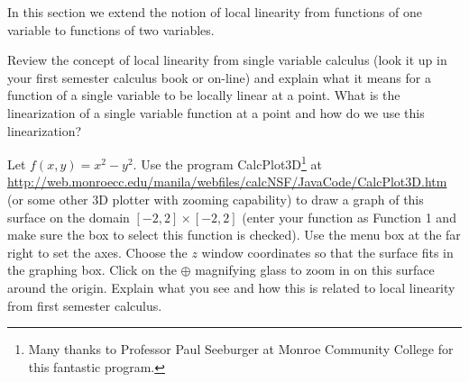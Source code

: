 \begin{pa} \label{PA:10.4} In this section we extend the notion of local linearity from functions of one variable to functions of two variables.
\ba
    \item Review the concept of local linearity from single variable calculus (look it up in your first semester calculus book or on-line) and explain what it means for a function of a single variable to be locally linear at a point. What is the linearization of a single variable function at a point and how do we use this linearization?



\begin{comment}

A function $f$ of the variable $x$ is locally linear at the point $(a,f(a))$ if the graph of $f$ ``looks" like a line (the tangent line) as we zoom in on it near the point $(a,f(a))$. Recall that the line tangent to $f$ at $(a,f(a))$ has equation
\[L(x) = f(a) + f'(a)(x-a).\]
The function $L$ is called the \emph{linearization} of $f$ at $a$. The linearization $L(x)$ is a good approximation of $f(x)$ for values of $x$ close to $a$.

\end{comment}

    \item Let $f(x,y) = x^2-y^2$. Use the program CalcPlot3D\footnote{Many thanks to Professor Paul Seeburger at Monroe Community College for this fantastic program.} at \url{http://web.monroecc.edu/manila/webfiles/calcNSF/JavaCode/CalcPlot3D.htm} (or some other 3D plotter with zooming capability) to draw a graph of this surface on the domain $[-2,2] \times [-2,2]$ (enter your function as Function 1 and make sure the box to select this function is checked). Use the menu box at the far right to set the axes. Choose the $z$ window coordinates so that the surface fits in the graphing box. Click on the $\oplus$ magnifying glass to zoom in on this surface around the origin. Explain what you see and how this is related to local linearity from first semester calculus.



\begin{comment}

As we magnify the graph of $f$ around a point, the surface looks like a plane -- a tangent plane to the surface at that point. This is \emph{local linearity} of a function of two variables. The tangent plane plays the role for functions of two variables that the tangent line played in single variable calculus. If we let $L(x,y)$ be the plane tangent to $f$ at the point $(a,b)$, then for $(x,y)$ close to $(a,b)$ we have
\[f(x,y) \approx L(x,y).\]




\end{comment}
\end{pa}
